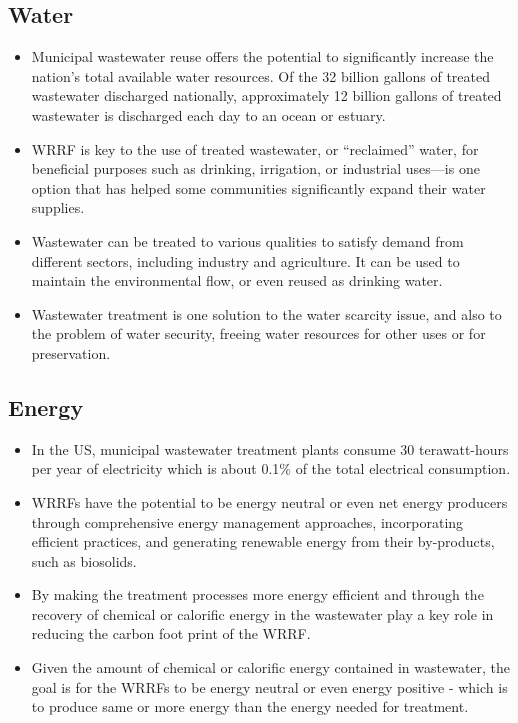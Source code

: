 \subsection{Water}
\begin{itemize}
\item Municipal wastewater reuse offers the potential to significantly increase the nation’s total available water resources. Of the 32 billion gallons of treated wastewater discharged nationally, approximately 12 billion gallons of treated wastewater is discharged each day to an ocean or estuary.
\item WRRF is key to the use of treated wastewater, or “reclaimed” water, for beneficial purposes such as drinking, irrigation, or industrial uses—is one option that has helped some communities significantly expand their water supplies.
\item Wastewater can be treated to various qualities to satisfy demand from different sectors, including industry and agriculture. It can be used to maintain the environmental flow, or even reused as drinking water. 
\item Wastewater treatment is one solution to the water scarcity issue, and also to the problem of water security, freeing water resources for other uses or for preservation.
\end{itemize}




\subsection{Energy}
\begin{itemize}
\item In the US, municipal wastewater treatment plants consume 30 terawatt-hours per year of electricity which is about 0.1\% of the total electrical consumption.  
\item WRRFs have the potential to be energy neutral or even net energy producers through comprehensive energy management approaches, incorporating efficient practices, and generating renewable energy from their by-products, such as biosolids.

\item By making the treatment processes more energy efficient and through the recovery of chemical or calorific energy in the wastewater play a key role in reducing the carbon foot print of the WRRF. 

\item Given the amount of chemical or calorific energy contained in wastewater, the goal is for the WRRFs to be energy neutral or even energy positive - which is to produce same or more energy than the energy needed for treatment.
\end{itemize}



